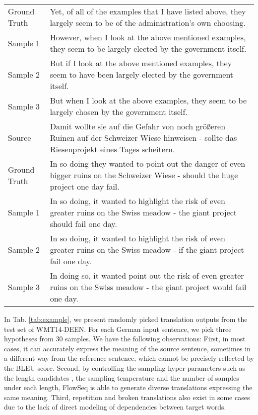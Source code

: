 \documentclass[11pt,a4paper]{article}
\begin{document}
\begin{table*}[ht!]
\begin{tabular}{p{2.5cm}p{12cm}}
\textcolor{mypink}{Ground Truth} & \textcolor{mypink}{Yet, of all of the examples that I have listed above, they largely seem to be of the administration's own choosing.}
\\
Sample 1 & However, when I look at the above mentioned examples, they seem to be largely elected by the government itself. \\
Sample 2 &  But if I look at the above mentioned examples, they seem to have been largely elected by the government itself.\\
Sample 3 &  But when I look at the above examples, they seem to be largely chosen by the government itself. \\
\midrule
\textcolor{myblue}{Source} & \textcolor{myblue}{Damit wollte sie auf die Gefahr von noch gr\"{o}ßeren Ruinen auf der Schweizer Wiese hinweisen - sollte das Riesenprojekt eines Tages scheitern.} \\
\textcolor{mypink}{Ground Truth} & \textcolor{mypink}{In so doing they wanted to point out the danger of even bigger ruins on the Schweizer Wiese - should the huge project one day fail.} \\
Sample 1 &  In so doing, it wanted to highlight the risk of even greater ruins on the Swiss meadow - the giant project should fail one day. \\
Sample 2 & In so doing, it wanted to highlight the risk of even greater ruins on the Swiss meadow - if the giant project fail one day. \\
Sample 3 &  In doing so, it wanted point out the risk of even greater ruins on the Swiss meadow - the giant project would fail one day. \\
\bottomrule
\end{tabular}
\caption{Examples of translation outputs from FlowSeq-base with sampling hyperparameters  on WMT14-DEEN.}
\label{tab:example}
    \vspace{-2mm}
\end{table*}
In Tab. \ref{tab:example}, we present randomly picked translation outputs from the test set of WMT14-DEEN. For each German input sentence, we pick three hypotheses from 30 samples. We have the following observations: First, in most cases, it can accurately express the meaning of the source sentence, sometimes in a different way from the reference sentence, which cannot be precisely reflected by the BLEU score.
Second, by controlling the sampling hyper-parameters such as the length candidates , the sampling temperature  and the number of samples  under each length, FlowSeq is able to generate diverse translations expressing the same meaning.
Third, repetition and broken translations also exist in some cases due to the lack of direct modeling of dependencies between target words.
\end{document}
